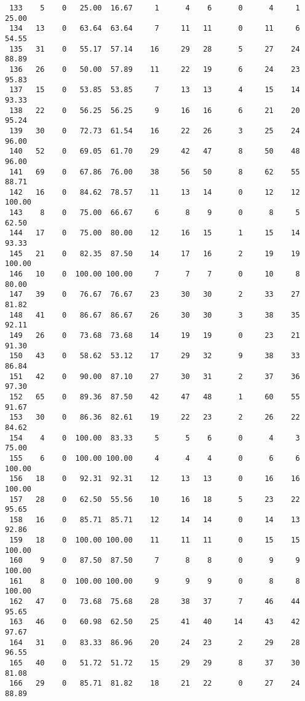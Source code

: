 \begin{verbatim}
 133    5    0   25.00  16.67     1      4    6      0      4     1    25.00
 134   13    0   63.64  63.64     7     11   11      0     11     6    54.55
 135   31    0   55.17  57.14    16     29   28      5     27    24    88.89
 136   26    0   50.00  57.89    11     22   19      6     24    23    95.83
 137   15    0   53.85  53.85     7     13   13      4     15    14    93.33
 138   22    0   56.25  56.25     9     16   16      6     21    20    95.24
 139   30    0   72.73  61.54    16     22   26      3     25    24    96.00
 140   52    0   69.05  61.70    29     42   47      8     50    48    96.00
 141   69    0   67.86  76.00    38     56   50      8     62    55    88.71
 142   16    0   84.62  78.57    11     13   14      0     12    12   100.00
 143    8    0   75.00  66.67     6      8    9      0      8     5    62.50
 144   17    0   75.00  80.00    12     16   15      1     15    14    93.33
 145   21    0   82.35  87.50    14     17   16      2     19    19   100.00
 146   10    0  100.00 100.00     7      7    7      0     10     8    80.00
 147   39    0   76.67  76.67    23     30   30      2     33    27    81.82
 148   41    0   86.67  86.67    26     30   30      3     38    35    92.11
 149   26    0   73.68  73.68    14     19   19      0     23    21    91.30
 150   43    0   58.62  53.12    17     29   32      9     38    33    86.84
 151   42    0   90.00  87.10    27     30   31      2     37    36    97.30
 152   65    0   89.36  87.50    42     47   48      1     60    55    91.67
 153   30    0   86.36  82.61    19     22   23      2     26    22    84.62
 154    4    0  100.00  83.33     5      5    6      0      4     3    75.00
 155    6    0  100.00 100.00     4      4    4      0      6     6   100.00
 156   18    0   92.31  92.31    12     13   13      0     16    16   100.00
 157   28    0   62.50  55.56    10     16   18      5     23    22    95.65
 158   16    0   85.71  85.71    12     14   14      0     14    13    92.86
 159   18    0  100.00 100.00    11     11   11      0     15    15   100.00
 160    9    0   87.50  87.50     7      8    8      0      9     9   100.00
 161    8    0  100.00 100.00     9      9    9      0      8     8   100.00
 162   47    0   73.68  75.68    28     38   37      7     46    44    95.65
 163   46    0   60.98  62.50    25     41   40     14     43    42    97.67
 164   31    0   83.33  86.96    20     24   23      2     29    28    96.55
 165   40    0   51.72  51.72    15     29   29      8     37    30    81.08
 166   29    0   85.71  81.82    18     21   22      0     27    24    88.89

\end{verbatim}
